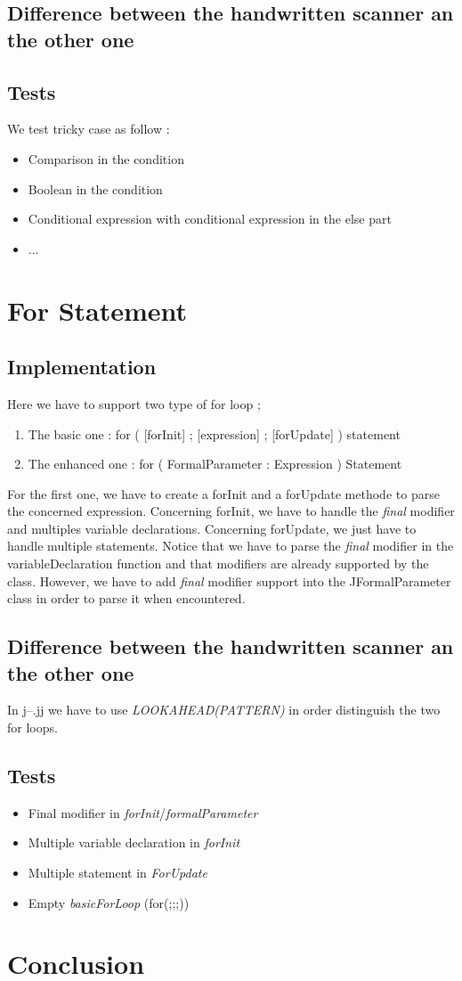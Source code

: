 \documentclass[10pt,a4paper]{article}
\begin{document}
\subsection{Difference between the handwritten scanner an the other one}
\subsection{Tests}
We test tricky case as follow :
\begin{itemize}
\item{Comparison in the condition}
\item{Boolean in the condition}
\item{Conditional expression with conditional expression in the else part}
\item{...}
\end{itemize}
\section{For Statement}
\subsection{Implementation}
Here we have to support two type of for loop ;
\begin{enumerate}
\item{The basic one : for ( [forInit] ; [expression] ; [forUpdate] ) statement}
\item{The enhanced one : for ( FormalParameter : Expression ) Statement}
\end{enumerate}

For the first one, we have to create a forInit and a forUpdate methode to parse the concerned expression. Concerning forInit, we have to handle the \textit{final} modifier and multiples variable declarations. Concerning forUpdate, we just have to handle multiple statements. Notice that we have to parse the \textit{final} modifier in the variableDeclaration function and that modifiers are already supported by the class. However, we have to add \textit{final} modifier support into the JFormalParameter class in order to parse it when encountered.

\subsection{Difference between the handwritten scanner an the other one}
In j--.jj we have to use \textit{LOOKAHEAD(PATTERN)} in order distinguish the two for loops.  
\subsection{Tests}
\begin{itemize}
\item{Final modifier in \textit{forInit}/\textit{formalParameter}}
\item{Multiple variable declaration in \textit{forInit}}
\item{Multiple statement in \textit{ForUpdate}}
\item{Empty \textit{basicForLoop} (for(;;;))}
\end{itemize}

\section{Conclusion}
\end{document}

